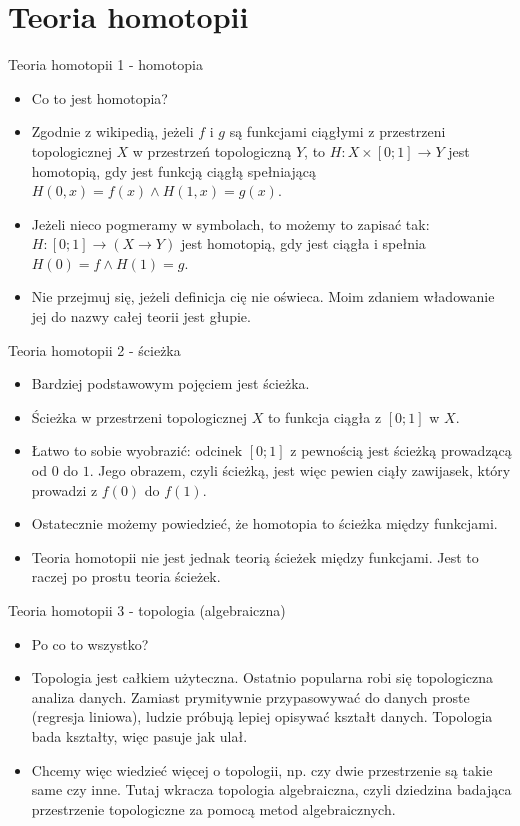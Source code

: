 \documentclass{beamer}
\begin{document}
\section{Teoria homotopii}

\begin{frame}{Teoria homotopii 1 - homotopia}
\begin{itemize}
	\item Co to jest homotopia?
	\item Zgodnie z wikipedią, jeżeli $f$ i $g$ są funkcjami ciągłymi z przestrzeni topologicznej $X$ w przestrzeń topologiczną $Y$, to $H: X \times [0; 1] \to Y$ jest homotopią, gdy jest funkcją ciągłą spełniającą $H(0, x) = f(x) \land H(1, x) = g(x)$.
	\item Jeżeli nieco pogmeramy w symbolach, to możemy to zapisać tak: $H: [0; 1] \to (X \to Y)$ jest homotopią, gdy jest ciągła i spełnia $H(0) = f \land H(1) = g$.
	\item Nie przejmuj się, jeżeli definicja cię nie oświeca. Moim zdaniem władowanie jej do nazwy całej teorii jest głupie.
\end{itemize}
\end{frame}

\begin{frame}{Teoria homotopii 2 - ścieżka}
\begin{itemize}
	\item Bardziej podstawowym pojęciem jest ścieżka.
	\item Ścieżka w przestrzeni topologicznej $X$ to funkcja ciągła z $[0; 1]$ w $X$.
	\item Łatwo to sobie wyobrazić: odcinek $[0; 1]$ z pewnością jest ścieżką prowadzącą od $0$ do $1$. Jego obrazem, czyli ścieżką, jest więc pewien ciąły zawijasek, który prowadzi z $f(0)$ do $f(1)$.
	\item Ostatecznie możemy powiedzieć, że homotopia to ścieżka między funkcjami.
	\item Teoria homotopii nie jest jednak teorią ścieżek między funkcjami. Jest to raczej po prostu teoria ścieżek.
\end{itemize}
\end{frame}

\begin{frame}{Teoria homotopii 3 - topologia (algebraiczna)}
\begin{itemize}
	\item Po co to wszystko?
	\item Topologia jest całkiem użyteczna. Ostatnio popularna robi się topologiczna analiza danych. Zamiast prymitywnie przypasowywać do danych proste (regresja liniowa), ludzie próbują lepiej opisywać kształt danych. Topologia bada kształty, więc pasuje jak ulał.
	\item Chcemy więc wiedzieć więcej o topologii, np. czy dwie przestrzenie są takie same czy inne. Tutaj wkracza topologia algebraiczna, czyli dziedzina badająca przestrzenie topologiczne za pomocą metod algebraicznych.
\end{itemize}
\end{frame}
\end{document}
